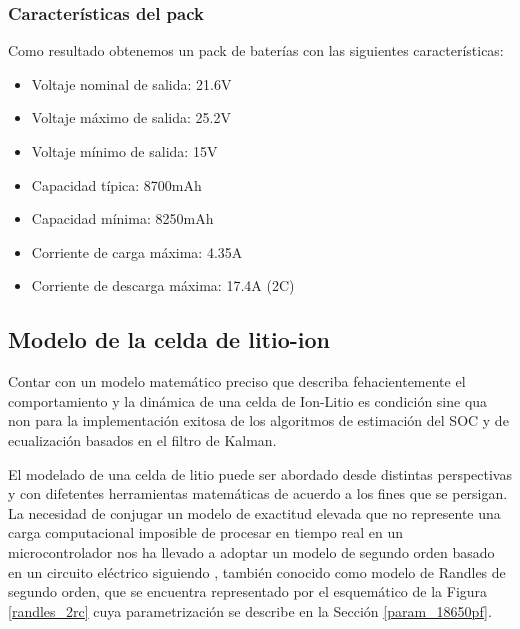 \documentclass[10pt,a4paper]{article}
\begin{document}
\subsubsection{Caracter\'isticas del pack}\label{caract_pack}

Como resultado obtenemos un pack de bater\'ias con las siguientes
caracter\'isticas:

\begin{itemize}
    \item Voltaje nominal de salida: 21.6V
    \item Voltaje m\'aximo de salida: 25.2V
    \item Voltaje m\'inimo de salida: 15V
    \item Capacidad t\'ipica: 8700mAh
    \item Capacidad m\'inima: 8250mAh
    \item Corriente de carga m\'axima: 4.35A
    \item Corriente de descarga m\'axima: 17.4A (2C)
\end{itemize}

\subsection{Modelo de la celda de litio-ion}\label{dev_batt_model}

Contar con un modelo matemático preciso que describa fehacientemente el
comportamiento y la dinámica de una celda de Ion-Litio es condición sine qua non
para la implementación exitosa de los algoritmos de estimación del
\acrshort{SOC} y de ecualización basados en el filtro de Kalman.

El modelado de una celda de litio puede ser abordado desde distintas
perspectivas y con difetentes herramientas matemáticas de acuerdo a los fines
que se persigan. La necesidad de conjugar un modelo de exactitud elevada que no
represente una carga computacional imposible de procesar en tiempo real en un
microcontrolador nos ha llevado a adoptar un modelo de segundo orden basado en
un circuito eléctrico siguiendo \cite{spagnol_kalman}, también conocido como
modelo de Randles de segundo orden, que se encuentra representado por el
esquem\'atico de la Figura \ref{randles_2rc} cuya parametrizaci\'on se describe
en la Secci\'on \ref{param_18650pf}.
\end{document}
